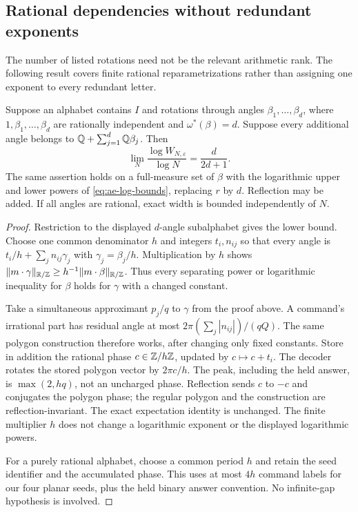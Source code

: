 \subsection{Rational dependencies without redundant exponents}
The number of listed rotations need not be the relevant arithmetic rank. The following result covers finite rational reparametrizations rather than assigning one exponent to every redundant letter.

\begin{corollary}\label{cor:rational-extension}
Suppose an alphabet contains $I$ and rotations through angles $\beta_1,\ldots,\beta_d$, where $1,\beta_1,\ldots,\beta_d$ are rationally independent and $\omega^*(\beta)=d$. Suppose every additional angle belongs to $\mathbb Q+\sum_{j=1}^d\mathbb Q\beta_j$. Then
\[
       \lim_N\frac{\log W_{N,\varepsilon}}{\log N}=\frac{d}{2d+1}.
\]
The same assertion holds on a full-measure set of $\beta$ with the logarithmic upper and lower powers of \eqref{eq:ae-log-bounds}, replacing $r$ by $d$. Reflection may be added. If all angles are rational, exact width is bounded independently of $N$.
\end{corollary}
\begin{proof}
Restriction to the displayed $d$-angle subalphabet gives the lower bound. Choose one common denominator $h$ and integers $t_i,n_{ij}$ so that every angle is
$t_i/h+\sum_jn_{ij}\gamma_j$ with $\gamma_j=\beta_j/h$. Multiplication by $h$ shows
$\lVert m\cdot\gamma\rVert_{\mathbb R/\mathbb Z}\ge h^{-1}\lVert m\cdot\beta\rVert_{\mathbb R/\mathbb Z}$.
Thus every separating power or logarithmic inequality for $\beta$ holds for $\gamma$ with a changed constant.

Take a simultaneous approximant $p_j/q$ to $\gamma$ from the proof above. A command's irrational part has residual angle at most
$2\pi(\sum_j|n_{ij}|)/(qQ)$. The same polygon construction therefore works, after changing only fixed constants. Store in addition the rational phase $c\in\mathbb Z/h\mathbb Z$, updated by $c\mapsto c+t_i$. The decoder rotates the stored polygon vector by $2\pi c/h$. The peak, including the held answer, is $\max(2,hq)$, not an uncharged phase. Reflection sends $c$ to $-c$ and conjugates the polygon phase; the regular polygon and the construction are reflection-invariant. The exact expectation identity is unchanged. The finite multiplier $h$ does not change a logarithmic exponent or the displayed logarithmic powers.

For a purely rational alphabet, choose a common period $h$ and retain the seed identifier and the accumulated phase. This uses at most $4h$ command labels for our four planar seeds, plus the held binary answer convention. No infinite-gap hypothesis is involved.
\end{proof}
